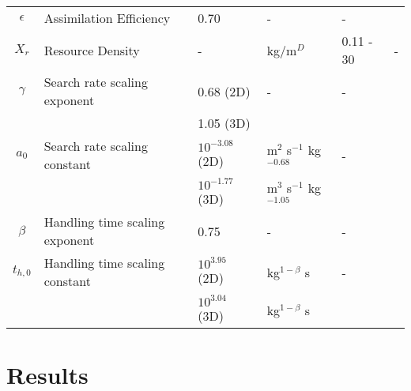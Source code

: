 \documentclass[a4paper, 11pt, hidelinks]{article} %
\begin{document}
\begin{centering}
\begin{table}[h!]
{\begin{tabular}{c p{3.9cm} l l l p{3cm}}
				$\epsilon$	& Assimilation Efficiency & 0.70 & - & - 		& \cite{Peters1983} \\
				$X_r$ 		& Resource Density		& -		& kg/m$^D$		& 0.11 - 30				& -\\
				$\gamma$	& Search rate scaling exponent & 0.68 (2D)	& - & - & \cite{Pawar2012} \\
				&						& 1.05 (3D)\\
				$a_0$		& Search rate scaling constant & $10^{-3.08}$ (2D) & m$^2$ s$^{-1}$ kg$^{-0.68}$   & - &\cite{Pawar2012}	\\
				&						& $10^{-1.77}$ (3D)& m$^3$ s$^{-1}$ kg$^{-1.05} $\\
				$\beta$		& Handling time scaling exponent& 0.75 & - & - & \cite{Pawar2012}\\
				$t_{h, 0}$	& Handling time scaling constant& $10^{3.95}$ (2D) &kg$^{1-\beta}$ s& -& \cite{Pawar2012}	\\
				&						& $10^{3.04}$ (3D)			&kg$^{1-\beta}$ s\\
				\hline
			\end{tabular}
		}%
		\end{table}
	\end{centering}

	\newpage

	\nolinenumbers
\section{Results}
	\linenumbers
	
\end{document}
